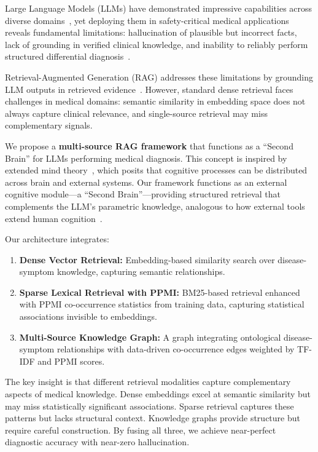 \documentclass[preprint,12pt]{elsarticle}
\begin{document}
Large Language Models (LLMs) have demonstrated impressive capabilities across diverse domains~\cite{brown2020language,openai2023gpt4}, yet deploying them in safety-critical medical applications reveals fundamental limitations: hallucination of plausible but incorrect facts, lack of grounding in verified clinical knowledge, and inability to reliably perform structured differential diagnosis~\cite{ji2023survey,singhal2023large}.

Retrieval-Augmented Generation (RAG) addresses these limitations by grounding LLM outputs in retrieved evidence~\cite{lewis2020retrieval,gao2023retrieval}. However, standard dense retrieval faces challenges in medical domains: semantic similarity in embedding space does not always capture clinical relevance, and single-source retrieval may miss complementary signals. 

We propose a \textbf{multi-source RAG framework} that functions as a ``Second Brain'' for LLMs performing medical diagnosis. This concept is inspired by extended mind theory~\cite{clark1998extended}, which posits that cognitive processes can be distributed across brain and external systems. Our framework functions as an external cognitive module—a ``Second Brain''—providing structured retrieval that complements the LLM's parametric knowledge, analogous to how external tools extend human cognition~\cite{hutchins1995cognition}.

Our architecture integrates:

\begin{enumerate}
    \item \textbf{Dense Vector Retrieval:} Embedding-based similarity search over disease-symptom knowledge, capturing semantic relationships.
    \item \textbf{Sparse Lexical Retrieval with PPMI:} BM25-based retrieval enhanced with PPMI co-occurrence statistics from training data, capturing statistical associations invisible to embeddings.
    \item \textbf{Multi-Source Knowledge Graph:} A graph integrating ontological disease-symptom relationships with data-driven co-occurrence edges weighted by TF-IDF and PPMI scores.
\end{enumerate}

The key insight is that different retrieval modalities capture complementary aspects of medical knowledge. Dense embeddings excel at semantic similarity but may miss statistically significant associations. Sparse retrieval captures these patterns but lacks structural context. Knowledge graphs provide structure but require careful construction. By fusing all three, we achieve near-perfect diagnostic accuracy with near-zero hallucination.
\end{document}
